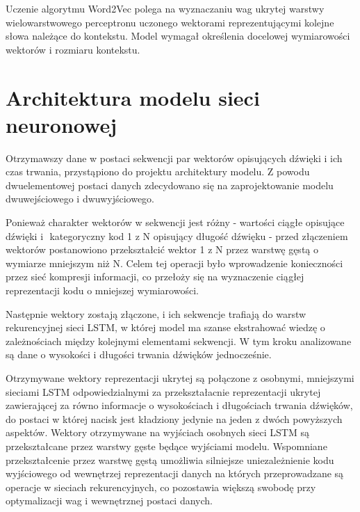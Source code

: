 {{        Uczenie algorytmu Word2Vec polega na wyznaczaniu wag ukrytej warstwy wielowarstwowego perceptronu
        uczonego wektorami reprezentującymi kolejne słowa należące do kontekstu.
        Model wymagał określenia docelowej wymiarowości wektorów i\,\,rozmiaru kontekstu. 
    }
    
    \section{Architektura modelu sieci neuronowej}\label{chap:main_model}
    {
        Otrzymawszy dane w\,\,postaci sekwencji par wektorów opisujących dźwięki i\,\,ich czas trwania,
        przystąpiono do projektu architektury modelu. Z\,\,powodu dwuelementowej postaci danych
        zdecydowano się na zaprojektowanie modelu dwuwejściowego i\,\,dwuwyjściowego.

        Ponieważ charakter wektorów w\,\,sekwencji jest różny - wartości ciągłe opisujące dźwięki i\,\,
        kategoryczny kod 1 z\,\,N opisujący długość dźwięku - przed złączeniem wektorów postanowiono 
        przekształcić wektor 1 z\,\,N przez warstwę gęstą o\,\,wymiarze mniejszym niż\,\,N. Celem tej operacji
        było wprowadzenie konieczności przez sieć kompresji informacji, co przełoży się 
        na wyznaczenie ciągłej reprezentacji kodu o\,\,mniejszej wymiarowości. 

        Następnie wektory zostają złączone, i\,\,ich sekwencje trafiają do warstw rekurencyjnej sieci LSTM, w\,\,której model ma szanse ekstrahować wiedzę o\,\,zależnościach między kolejnymi elementami sekwencji. W tym kroku analizowane są dane o wysokości i długości trwania dźwięków jednocześnie.

        Otrzymywane wektory reprezentacji ukrytej są połączone z\,\,osobnymi, 
        mniejszymi sieciami LSTM odpowiedzialnymi za przekształacnie reprezentacji 
        ukrytej zawierającej za równo informacje o wysokościach i długościach trwania dźwięków, 
        do postaci w której nacisk jest kładziony jedynie na jeden z dwóch powyższych aspektów. 
        Wektory otrzymywane na wyjściach osobnych sieci LSTM są przekształcane przez warstwy gęste będące wyjściami modelu. 
        Wspomniane przekształcenie przez warstwę gęstą umożliwia silniejsze uniezależnienie kodu 
        wyjściowego od wewnętrzej reprezentacji danych na których przeprowadzane są operacje 
        w sieciach rekurencyjnych, co pozostawia większą swobodę przy optymalizacji wag i wewnętrznej postaci danych.
        
}}
